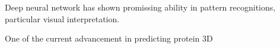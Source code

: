 Deep neural network has shown promissing ability in pattern recognitions, particular visual interpretation.
\par 

One of the current advancement in predicting protein 3D 